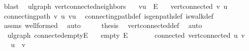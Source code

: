 \begin{isabellebody}
\ blast\isanewline
{}\isamarkupfalse%
%
\endisatagproof
{\isafoldproof}%
%
\isadelimproof
\isanewline
%
\endisadelimproof
\isanewline
{}\isamarkupfalse%
\ {\isacharparenleft}{\kern0pt}\ ulgraph{\isacharparenright}{\kern0pt}\ vert{\isacharunderscore}{\kern0pt}connected{\isacharunderscore}{\kern0pt}neighbors{\isacharcolon}{\kern0pt}\isanewline
\ \ \ {\isachardoublequoteopen}{\isacharbraceleft}{\kern0pt}v{\isacharcomma}{\kern0pt}u{\isacharbraceright}{\kern0pt}\ {\isasymin}\ E{\isachardoublequoteclose}\isanewline
\ \ \ {\isachardoublequoteopen}vert{\isacharunderscore}{\kern0pt}connected\ v\ u{\isachardoublequoteclose}\isanewline
%
\isadelimproof
%
\endisadelimproof
%
\isatagproof
{}\isamarkupfalse%
{\isacharminus}{\kern0pt}\isanewline
\ \ \isamarkupfalse%
\ {\isachardoublequoteopen}connecting{\isacharunderscore}{\kern0pt}path\ v\ u\ {\isacharbrackleft}{\kern0pt}v{\isacharcomma}{\kern0pt}u{\isacharbrackright}{\kern0pt}{\isachardoublequoteclose}\ \isamarkupfalse%
\ connecting{\isacharunderscore}{\kern0pt}path{\isacharunderscore}{\kern0pt}def\ is{\isacharunderscore}{\kern0pt}gen{\isacharunderscore}{\kern0pt}path{\isacharunderscore}{\kern0pt}def\ is{\isacharunderscore}{\kern0pt}walk{\isacharunderscore}{\kern0pt}def\ \isamarkupfalse%
\ assms\ wellformed\ \isamarkupfalse%
\ auto\isanewline
\ \ \isamarkupfalse%
\ \isamarkupfalse%
\ {\isacharquery}{\kern0pt}thesis\ \isamarkupfalse%
\ vert{\isacharunderscore}{\kern0pt}connected{\isacharunderscore}{\kern0pt}def\ \isamarkupfalse%
\ auto\isanewline
{}\isamarkupfalse%
%
\endisatagproof
{\isafoldproof}%
%
\isadelimproof
\isanewline
%
\endisadelimproof
\isanewline
{}\isamarkupfalse%
\ {\isacharparenleft}{\kern0pt}\ ulgraph{\isacharparenright}{\kern0pt}\ connected{\isacharunderscore}{\kern0pt}empty{\isacharunderscore}{\kern0pt}E{\isacharcolon}{\kern0pt}\isanewline
\ \ \ empty{\isacharcolon}{\kern0pt}\ {\isachardoublequoteopen}E\ {\isacharequal}{\kern0pt}\ {\isacharbraceleft}{\kern0pt}{\isacharbraceright}{\kern0pt}{\isachardoublequoteclose}\isanewline
\ \ \ \ \ connected{\isacharcolon}{\kern0pt}\ {\isachardoublequoteopen}vert{\isacharunderscore}{\kern0pt}connected\ u\ v{\isachardoublequoteclose}\isanewline
\ \ \ {\isachardoublequoteopen}u\ {\isacharequal}{\kern0pt}\ v{\isachardoublequoteclose}\isanewline

\end{isabellebody}
